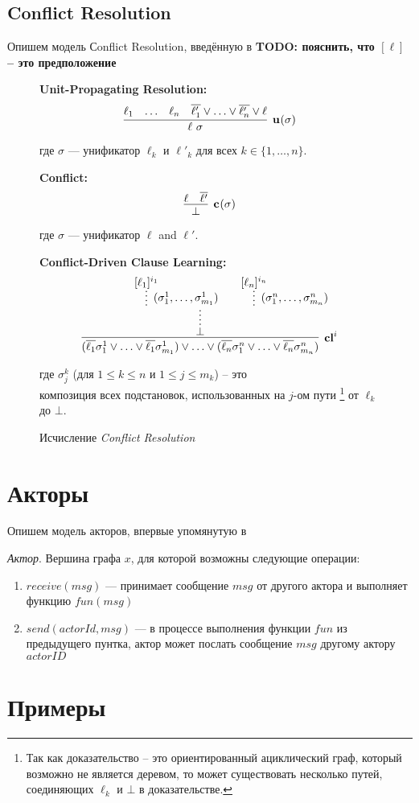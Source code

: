 \subsection{Conflict Resolution}
\label{sec:CR}
Опишем модель Сonflict Resolution, введённую в 
\cite{DBLP:journals/corr/SlaneyP16}
\textbf{TODO: пояснить, что $[\ell]$ -- это предположение}

\begin{figure}
\begin{calculus}
\centering
\textbf{Unit-Propagating Resolution:}
$$
\infer[\upr{}{\sigma}]
	  {\ell~\sigma}
      {\ell_1 & \ldots & \ell_n & \overline{\ell'_1} \vee \ldots \vee \overline{\ell'_n} \vee \ell}
$$

где $\sigma$ --- унификатор $\ell_k$ и $\ell'_k$ для всех $k \in \{1, \ldots, n \}$.

\bigskip

\textbf{Conflict:}
$$
\infer[\confl{}{\sigma}]
      {\bot}
      {\ell & \overline{\ell'}}
$$

где $\sigma$ --- унификатор $\ell$ and $\ell'$.

\bigskip

\textbf{Conflict-Driven Clause Learning:}
$$
\infer[\cdcl{}{i}]
      {(\overline{\ell_1} \sigma^1_1 \vee \ldots \vee \overline{\ell_1} \sigma^1_{m_1}) \vee \ldots \vee (\overline{\ell_n} \sigma^n_1 \vee \ldots \vee \overline{\ell_n} \sigma^n_{m_n})
      }
	  {\infer*{\bot}{\infer*[(\sigma_1^1,\ldots,\sigma_{m_1}^1)]{}{[\ell_1]^{\dls{i}{1}}} &  & \infer*[(\sigma_1^n,\ldots,\sigma_{m_n}^n)]{}{[\ell_n]^{\dls{i}{n}}}}
      }
$$

где $\sigma^k_j$ (для $1 \leq k \leq n$ и $1 \leq j \leq m_k$) -- это \\
композиция всех подстановок, использованных на $j$-ом пути \footnote{Так как
  доказательство -- это ориентированный ациклический граф, который возможно не
  является деревом, то может существовать несколько путей, соединяющих $\ell_k$ и
  $\bot$ в доказательстве.} от $\ell_k$ до $\bot$.

\end{calculus}
\caption{Исчисление \emph{Conflict Resolution}}
\label{fig:CR}
\end{figure}


\section{Акторы}

Опишем модель акторов, впервые упомянутую в \cite{Hewitt:1973:UMA:1624775.1624804}
\begin{definition}
  \emph{Актор}. Вершина графа $x$, для которой возможны следующие операции:
  \begin{enumerate}
  	\item $receive(msg)$ --- принимает сообщение $msg$ от другого актора и выполняет функцию $fun(msg)$
    \item $send(actorId, msg)$ --- в процессе выполнения функции $fun$ из предыдущего пунтка, актор может послать сообщение $msg$ другому актору $actorID$
  \end{enumerate}
\end{definition}


\section{Примеры}


